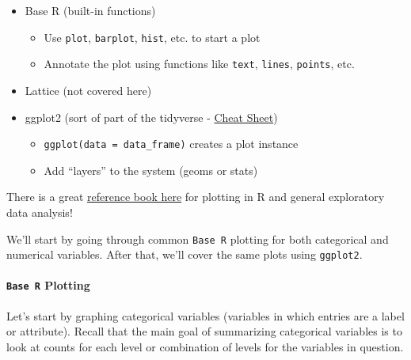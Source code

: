 \documentclass[
]{book}
\providecommand{\tightlist}{%
  \setlength{\itemsep}{0pt}\setlength{\parskip}{0pt}}
\let\oldparagraph\paragraph
\renewcommand{\paragraph}[1]{\oldparagraph{#1}\mbox{}}
\theoremstyle{definition}
\theoremstyle{definition}
\theoremstyle{definition}
\theoremstyle{remark}
\begin{document}
\begin{itemize}
\item
  Base R (built-in functions)

  \begin{itemize}
  \tightlist
  \item
    Use \texttt{plot}, \texttt{barplot}, \texttt{hist}, etc. to start a plot\\
  \item
    Annotate the plot using functions like \texttt{text}, \texttt{lines}, \texttt{points}, etc.
  \end{itemize}
\item
  Lattice (not covered here)
\item
  ggplot2 (sort of part of the tidyverse - \href{https://www.google.com/url?sa=t\&rct=j\&q=\&esrc=s\&source=web\&cd=2\&cad=rja\&uact=8\&ved=2ahUKEwjFu_ep-rroAhXnknIEHf13Bq4QFjABegQICBAB\&url=https\%3A\%2F\%2Frstudio.com\%2Fwp-content\%2Fuploads\%2F2016\%2F11\%2Fggplot2-cheatsheet-2.1.pdf\&usg=AOvVaw1-6jSR5VfWs7V62OYxtDtG}{Cheat Sheet})

  \begin{itemize}
  \tightlist
  \item
    \texttt{ggplot(data\ =\ data\_frame)} creates a plot instance\\
  \item
    Add ``layers'' to the system (geoms or stats)
  \end{itemize}
\end{itemize}

There is a great \href{https://bookdown.org/rdpeng/exdata/plotting-systems.html}{reference book here} for plotting in R and general exploratory data analysis!

We'll start by going through common \texttt{Base\ R} plotting for both categorical and numerical variables. After that, we'll cover the same plots using \texttt{ggplot2}.

\hypertarget{base-r-plotting}{%
\paragraph{\texorpdfstring{\texttt{Base\ R} Plotting}{Base R Plotting}}\label{base-r-plotting}}

Let's start by graphing categorical variables (variables in which entries are a label or attribute). Recall that the main goal of summarizing categorical variables is to look at counts for each level or combination of levels for the variables in question.
\end{document}
